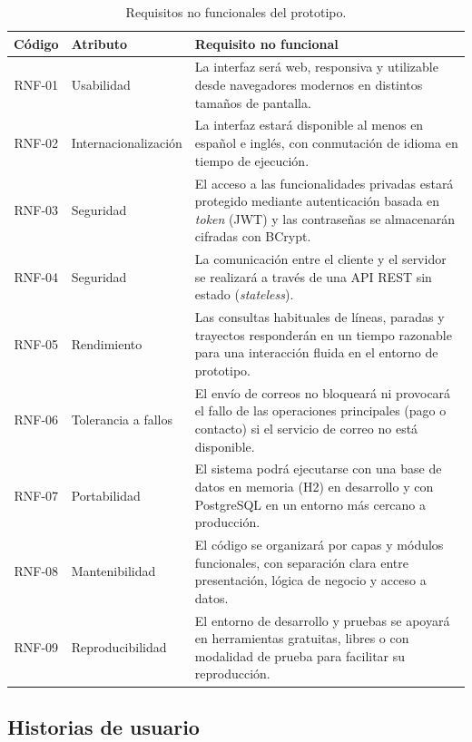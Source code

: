 \begin{table}[h!]
\centering
\small
\begin{tabular}{|c|p{4cm}|p{7.5cm}|}
\hline
\textbf{Código} & \textbf{Atributo} & \textbf{Requisito no funcional} \\ \hline
RNF-01 & Usabilidad & La interfaz será web, responsiva y utilizable desde navegadores modernos en distintos tamaños de pantalla. \\ \hline
RNF-02 & Internacionalización & La interfaz estará disponible al menos en español e inglés, con conmutación de idioma en tiempo de ejecución. \\ \hline
RNF-03 & Seguridad & El acceso a las funcionalidades privadas estará protegido mediante autenticación basada en \textit{token} (JWT) y las contraseñas se almacenarán cifradas con BCrypt. \\ \hline
RNF-04 & Seguridad & La comunicación entre el cliente y el servidor se realizará a través de una API REST sin estado (\textit{stateless}). \\ \hline
RNF-05 & Rendimiento & Las consultas habituales de líneas, paradas y trayectos responderán en un tiempo razonable para una interacción fluida en el entorno de prototipo. \\ \hline
RNF-06 & Tolerancia a fallos & El envío de correos no bloqueará ni provocará el fallo de las operaciones principales (pago o contacto) si el servicio de correo no está disponible. \\ \hline
RNF-07 & Portabilidad & El sistema podrá ejecutarse con una base de datos en memoria (H2) en desarrollo y con PostgreSQL en un entorno más cercano a producción. \\ \hline
RNF-08 & Mantenibilidad & El código se organizará por capas y módulos funcionales, con separación clara entre presentación, lógica de negocio y acceso a datos. \\ \hline
RNF-09 & Reproducibilidad & El entorno de desarrollo y pruebas se apoyará en herramientas gratuitas, libres o con modalidad de prueba para facilitar su reproducción. \\ \hline
\end{tabular}
\caption{Requisitos no funcionales del prototipo.}
\label{tab:rnf}
\end{table}


\subsection{Historias de usuario}
\label{sec:historias-usuario}

